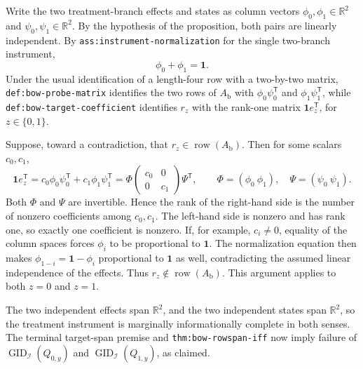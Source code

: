 Write the two treatment-branch effects and states as column vectors \(\phi_0,\phi_1\in\mathbb R^2\) and \(\psi_0,\psi_1\in\mathbb R^2\).  By the hypothesis of the proposition, both pairs are linearly independent.  By \texttt{ass:instrument-normalization} for the single two-branch instrument,
\[
 \phi_0+\phi_1=\mathbf 1.
\]
Under the usual identification of a length-four row with a two-by-two matrix, \texttt{def:bow-probe-matrix} identifies the two rows of \(A_{\mathrm b}\) with \(\phi_0\psi_0^{\mathsf T}\) and \(\phi_1\psi_1^{\mathsf T}\), while \texttt{def:bow-target-coefficient} identifies \(r_z\) with the rank-one matrix \(\mathbf 1 e_z^{\mathsf T}\), for \(z\in\{0,1\}\).

Suppose, toward a contradiction, that \(r_z\in\operatorname{row}(A_{\mathrm b})\).  Then for some scalars \(c_0,c_1\),
\[
 \mathbf 1e_z^{\mathsf T}
 =c_0\phi_0\psi_0^{\mathsf T}+c_1\phi_1\psi_1^{\mathsf T}
 =\Phi\begin{pmatrix}c_0&0\\0&c_1\end{pmatrix}\Psi^{\mathsf T},
 \qquad
 \Phi=(\phi_0\ \phi_1),\quad \Psi=(\psi_0\ \psi_1).
\]
Both \(\Phi\) and \(\Psi\) are invertible.  Hence the rank of the right-hand side is the number of nonzero coefficients among \(c_0,c_1\).  The left-hand side is nonzero and has rank one, so exactly one coefficient is nonzero.  If, for example, \(c_i\ne0\), equality of the column spaces forces \(\phi_i\) to be proportional to \(\mathbf 1\).  The normalization equation then makes \(\phi_{1-i}=\mathbf 1-\phi_i\) proportional to \(\mathbf 1\) as well, contradicting the assumed linear independence of the effects.  Thus \(r_z\notin\operatorname{row}(A_{\mathrm b})\).  This argument applies to both \(z=0\) and \(z=1\).

The two independent effects span \(\mathbb R^2\), and the two independent states span \(\mathbb R^2\), so the treatment instrument is marginally informationally complete in both senses.  The terminal target-span premise and \texttt{thm:bow-rowspan-iff} now imply failure of \(\operatorname{GID}_{\mathcal I}(Q_{0,y})\) and \(\operatorname{GID}_{\mathcal I}(Q_{1,y})\), as claimed.